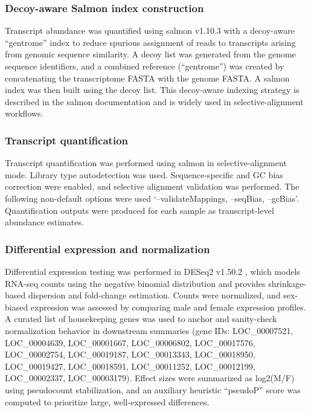 \documentclass[11pt]{article}
\begin{document}
\subsubsection{Decoy-aware Salmon index construction}
Transcript abundance was quantified using salmon v1.10.3 \cite{Patro2017Salmon} with a decoy-aware “gentrome” index to reduce spurious assignment of reads to transcripts arising from genomic sequence similarity. A decoy list was generated from the genome sequence identifiers, and a combined reference (“gentrome”) was created by concatenating the transcriptome FASTA with the genome FASTA. A salmon index was then built using the decoy list. This decoy-aware indexing strategy is described in the salmon documentation and is widely used in selective-alignment workflows.

\subsubsection{Transcript quantification}
Transcript quantification was performed using salmon in selective-alignment mode. Library type autodetection was used. Sequence-specific and GC bias correction were enabled, and selective alignment validation was performed. The following non-default options were used ‘--validateMappings, --seqBias, --gcBias’. Quantification outputs were produced for each sample as transcript-level abundance estimates.

\subsubsection{Differential expression and normalization}
Differential expression testing was performed in DESeq2 v1.50.2 \cite{Love2014DESeq2}, which models RNA-seq counts using the negative binomial distribution and provides shrinkage-based dispersion and fold-change estimation. Counts were normalized, and sex-biased expression was assessed by comparing male and female expression profiles. A curated list of housekeeping genes was used to anchor and sanity-check normalization behavior in downstream summaries (gene IDs: LOC\_00007521, LOC\_00004639, LOC\_00001667, LOC\_00006802, LOC\_00017576, LOC\_00002754, LOC\_00019187, LOC\_00013343, LOC\_00018950, LOC\_00019427, LOC\_00018591, LOC\_00011252, LOC\_00012199, LOC\_00002337, LOC\_00003179). Effect sizes were summarized as log2(M/F) using pseudocount stabilization, and an auxiliary heuristic “pseudoP” score was computed to prioritize large, well-expressed differences.
\end{document}
